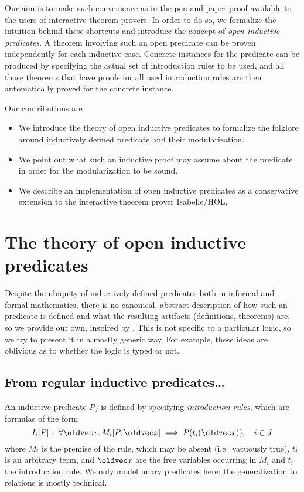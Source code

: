 \documentclass{llncs}
\makeatletter
\let\vec\oldvec%
\newcommand{\nolisttopbreak}{\par\nobreak\@afterheading}
\makeatother
\begin{document}
Our aim is to make such convenience as in the pen-and-paper proof available to the users of interactive theorem provers. In order to do so, we formalize the intuition behind these shortcuts and introduce the concept of \emph{open inductive predicates}. A theorem involving such an open predicate can be proven independently for each inductive case. Concrete instances for the predicate can be produced by specifying the actual set of introduction rules to be used, and all those theorems that have proofs for all used introduction rules are then automatically proved for the concrete instance.

\noindent Our contributions are\nolisttopbreak
\begin{itemize}
\item We introduce the theory of open inductive predicates to formalize the folklore around inductively defined predicate and their modularization.
\item We point out what such an inductive proof may assume about the predicate in order for the modularization to be sound.
\item We describe an implementation of open inductive predicates as a conservative extension to the interactive theorem prover Isabelle/HOL.
\end{itemize}

\section{The theory of open inductive predicates}

Despite the ubiquity of inductively defined predicates both in informal and formal mathematics, there is no canonical, abstract description of how such an predicate is defined and what the resulting artifacts (definitions, theorems) are, so we provide our own, inspired by \cite{paulson-2000}. This is not specific to a particular logic, so we try to present it in a mostly generic way. For example, these ideas are oblivious as to whether the logic is typed or not.

\subsection{From regular inductive predicates\ldots}

An inductive predicate $P_J$ is defined by specifying \emph{introduction rules}, which are formulas of the form
\[
I_i[P]:\ \forall \vec x.\,   M_i[P, \vec x] \implies P(t_i(\vec x)), \quad i \in J
\]
where $M_i$ is the premise of the rule, which may be absent (i.e.\ vacuously true), $t_i$ is an arbitrary term, and $\vec x$ are the free variables occurring in $M_i$ and $t_i$ the introduction rule. We only model unary predicates here; the generalization to relations is mostly technical.
\end{document}
